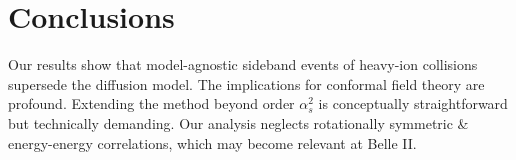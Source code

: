 \section{Conclusions}\label{sec:conclusions}

Our results show that model-agnostic sideband events of heavy-ion
collisions supersede the diffusion model. The implications for conformal
field theory are profound. Extending the method beyond order
$\alpha_s^2$ is conceptually straightforward but technically demanding.
Our analysis neglects rotationally symmetric & energy-energy correlations,
which may become relevant at Belle II.

